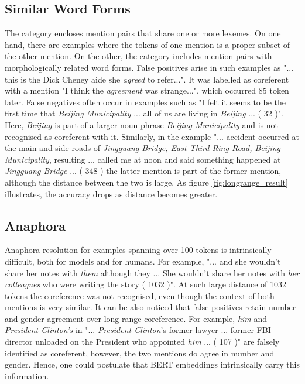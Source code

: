 \documentclass[11pt]{article}
\begin{document}
\subsection{Similar Word Forms} 
The category encloses mention pairs that share one or more lexemes. On one hand, there are examples where the tokens of one mention is a proper subset of the other mention. On the other, the category includes mention pairs with morphologically related word forms.
False positives arise in such examples as "... this is the Dick Cheney aide she \textit{agreed} to refer...". It was labelled as coreferent with a mention "I think the \textit{agreement} was strange...", which occurred 85 token later. 
False negatives often occur in examples such as "I felt it seems to be the first time that \textit{Beijing Municipality} ... all of us are living in \textit{Beijing} ... ( 32 )". Here, \textit{Beijing} is part of a larger noun phrase \textit{Beijing Municipality} and is not recognised as coreferent with it. Similarly, in the example "... accident occurred at the main and side roads of \textit{Jingguang Bridge, East Third Ring Road, Beijing Municipality}, resulting ... called me at noon and said something happened at \textit{Jingguang Bridge} ... ( 348 ) the latter mention is part of the former mention, although the distance between the two is large. As figure \ref{fig:longrange_result} illustrates, the accuracy drops as distance becomes greater.

\subsection{Anaphora}

Anaphora resolution for examples spanning over 100 tokens is intrinsically difficult, both for models and for humans. For example, "... and she wouldn't share her notes with \textit{them} although they ... She wouldn't share her notes with \textit{her colleagues} who were writing the story ( 1032 )". At such large distance of 1032 tokens the coreference was not recognised, even though the context of both mentions is very similar. It can be also noticed that false positives retain number and gender agreement over long-range coreference. For example, \textit{him} and \textit{President Clinton's} in "... \textit{President Clinton}'s former lawyer ... former FBI director unloaded on the President who appointed \textit{him} ... ( 107 )" are falsely identified as coreferent, however, the two mentions do agree in number and gender. Hence, one could postulate that BERT embeddings intrinsically carry this information. 
\end{document}
